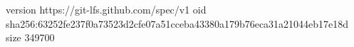 version https://git-lfs.github.com/spec/v1
oid sha256:63252fe237f0a73523d2cfe07a51cceba43380a179b76eca31a21044eb17e18d
size 349700
